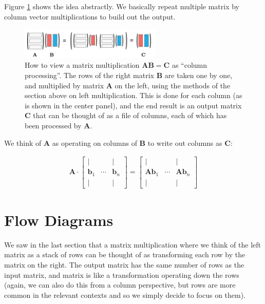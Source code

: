 Figure \ref{columnPerspective} shows the idea abstractly. We basically repeat multiple matrix by column vector multiplications to build out the output. 

\begin{figure}[h]
\centering
\includegraphics[width=0.6\textwidth]{images/columnPerspective.png}
\caption[Jeff Yoshimi.]{How to view a matrix multiplication  $\mathbf{A}\mathbf{B} = \mathbf{C}$ as ``column processing''.  The rows of the right matrix $\mathbf{B}$ are taken one by one, and multiplied by matrix $\mathbf{A}$  on the left, using the methods of the section above on left multiplication.  This is done for each column (as is shown in the center panel), and the end result is an output matrix $\mathbf{C}$ that can be thought of as a file of columns, each of which has been processed by $\mathbf{A}$.}
\label{columnPerspective}
\end{figure} 

We think of $\mathbf{A}$ as operating on columns of $\mathbf{B}$ to write out columns as $\mathbf{C}$:

\begin{align*}
\mathbf{A} \cdot
\begin{bmatrix}
\vert &        & \vert \\
\mathbf{b}_1 & \cdots & \mathbf{b}_n \\
\vert &        & \vert
\end{bmatrix}
=
\begin{bmatrix}
\vert &        & \vert \\
\mathbf{A} \mathbf{b}_1 & \cdots & \mathbf{A} \mathbf{b}_n \\
\vert &        & \vert
\end{bmatrix}
\end{align*}


\section{Flow Diagrams}\label{flowDiagrams}

We saw in the last section that a matrix multiplication where we think of the left matrix as a stack of rows can be thought of as transforming each row by the matrix on the right.  The output matrix has the same number of rows as the input matrix, and matrix is like a transformation operating down the rows (again, we can also do this from a column perspective, but rows are more common in the relevant contexts and so we simply decide to focus on them). 

